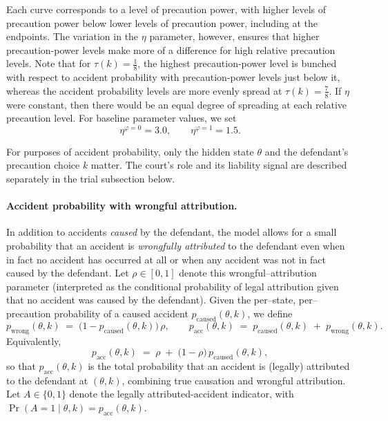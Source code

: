 \documentclass{article}
\begin{document}
Each curve corresponds to a level of precaution power, with higher levels of precaution power below lower levels of precaution power, including at the endpoints. The variation in the $\eta$ parameter, however, ensures that higher precaution-power levels make more of a difference for high relative precaution levels. Note that for $\tau(k) = \tfrac{1}{8}$, the highest precaution-power level is bunched with respect to accident probability with precaution-power levels just below it, whereas the accident probability levels are more evenly spread at $\tau(k) = \tfrac{7}{8}$. If $\eta$ were constant, then there would be an equal degree of spreading at each relative precaution level. For baseline parameter values, we set
\[
\eta^{\varphi=0}=3.0, \qquad \eta^{\varphi=1}=1.5.
\]

For purposes of accident probability, only the hidden state $\theta$ and the defendant’s precaution choice $k$ matter. The court’s role and its liability signal are described separately in the trial subsection below.

\paragraph{Accident probability with wrongful attribution.}
In addition to accidents \emph{caused} by the defendant, the model allows for a small probability that an accident is \emph{wrongfully attributed} to the defendant even when in fact no accident has occurred at all or when any accident was not in fact caused by the defendant. Let $\rho\in[0,1]$ denote this wrongful–attribution parameter (interpreted as the conditional probability of legal attribution given that no accident was caused by the defendant). Given the per–state, per–precaution probability of a caused accident $p_{\mathrm{caused}}(\theta,k)$, we define
\[
p_{\mathrm{wrong}}(\theta,k)\;=\;\bigl(1 - p_{\mathrm{caused}}(\theta,k)\bigr)\,\rho,
\qquad
p_{\mathrm{acc}}(\theta,k)\;=\;p_{\mathrm{caused}}(\theta,k)\;+\;p_{\mathrm{wrong}}(\theta,k).
\]
Equivalently,
\[
p_{\mathrm{acc}}(\theta,k)
\;=\;\rho \;+\; \bigl(1-\rho\bigr)\,p_{\mathrm{caused}}(\theta,k),
\]
so that $p_{\mathrm{acc}}(\theta,k)$ is the total probability that an accident is (legally) attributed to the defendant at $(\theta,k)$, combining true causation and wrongful attribution.
Let $A\in\{0,1\}$ denote the legally attributed-accident indicator, with $\Pr(A=1\mid \theta,k)=p_{\mathrm{acc}}(\theta,k)$.
\end{document}
